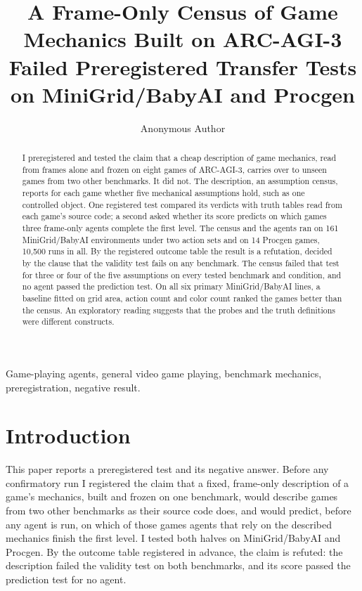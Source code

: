 \documentclass[journal]{IEEEtran}
\begin{document}
\title{A Frame-Only Census of Game Mechanics Built on ARC-AGI-3 Failed
Preregistered Transfer Tests on MiniGrid/BabyAI and Procgen}
\author{Anonymous Author}
\maketitle
\begin{abstract}
I preregistered and tested the claim that a cheap description of game
mechanics, read from frames alone and frozen on eight games of
ARC-AGI-3, carries over to unseen games from two other benchmarks. It
did not. The description, an assumption census, reports for each game
whether five mechanical assumptions hold, such as one controlled object.
One registered test compared its verdicts with truth tables read from
each game's source code; a second asked whether its score predicts on
which games three frame-only agents complete the first level. The census
and the agents ran on 161 MiniGrid/BabyAI environments under two action
sets and on 14 Procgen games, 10,500 runs in all. By the registered
outcome table the result is a refutation, decided by the clause that the
validity test fails on any benchmark. The census failed that test for
three or four of the five assumptions on every tested benchmark and
condition, and no agent passed the prediction test. On all six primary
MiniGrid/BabyAI lines, a baseline fitted on grid area, action count and
color count ranked the games better than the census. An exploratory
reading suggests that the probes and the truth definitions were
different constructs.
\end{abstract}
\begin{IEEEkeywords}
Game-playing agents, general video game playing, benchmark mechanics,
preregistration, negative result.
\end{IEEEkeywords}
\section{Introduction}\label{introduction}

This paper reports a preregistered test and its negative answer. Before
any confirmatory run I registered the claim that a fixed, frame-only
description of a game's mechanics, built and frozen on one benchmark,
would describe games from two other benchmarks as their source code
does, and would predict, before any agent is run, on which of those
games agents that rely on the described mechanics finish the first
level. I tested both halves on MiniGrid/BabyAI and Procgen. By the
outcome table registered in advance, the claim is refuted: the
description failed the validity test on both benchmarks, and its score
passed the prediction test for no agent.
\end{document}
